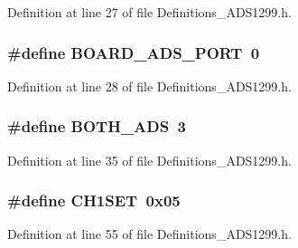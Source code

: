 Definition at line 27 of file Definitions\+\_\+\+A\+D\+S1299.\+h.

\subsubsection[{\texorpdfstring{B\+O\+A\+R\+D\+\_\+\+A\+D\+S\+\_\+\+P\+O\+RT}{BOARD_ADS_PORT}}]{\setlength{\rightskip}{0pt plus 5cm}\#define B\+O\+A\+R\+D\+\_\+\+A\+D\+S\+\_\+\+P\+O\+RT~0}\hypertarget{group__Definitions__ADS1299_ga27b778d3ec5d14180a1be88ed1badc02}{}\label{group__Definitions__ADS1299_ga27b778d3ec5d14180a1be88ed1badc02}


Definition at line 28 of file Definitions\+\_\+\+A\+D\+S1299.\+h.

\subsubsection[{\texorpdfstring{B\+O\+T\+H\+\_\+\+A\+DS}{BOTH_ADS}}]{\setlength{\rightskip}{0pt plus 5cm}\#define B\+O\+T\+H\+\_\+\+A\+DS~3}\hypertarget{group__Definitions__ADS1299_gaadd2d23e89f5cb1196176cee428631a7}{}\label{group__Definitions__ADS1299_gaadd2d23e89f5cb1196176cee428631a7}


Definition at line 35 of file Definitions\+\_\+\+A\+D\+S1299.\+h.

\subsubsection[{\texorpdfstring{C\+H1\+S\+ET}{CH1SET}}]{\setlength{\rightskip}{0pt plus 5cm}\#define C\+H1\+S\+ET~0x05}\hypertarget{group__Definitions__ADS1299_ga8fea370fa35eeb28355a58a40783ec99}{}\label{group__Definitions__ADS1299_ga8fea370fa35eeb28355a58a40783ec99}


Definition at line 55 of file Definitions\+\_\+\+A\+D\+S1299.\+h.

